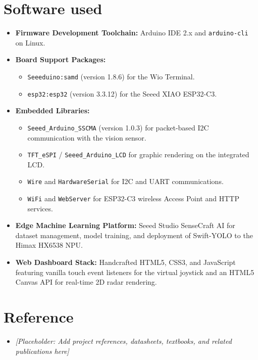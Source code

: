 \documentclass{article}
\begin{document}
\section{Software used}

\begin{itemize}
    \item \textbf{Firmware Development Toolchain:} Arduino IDE 2.x and \texttt{arduino-cli} on Linux.
    \item \textbf{Board Support Packages:}
    \begin{itemize}
        \item \texttt{Seeeduino:samd} (version 1.8.6) for the Wio Terminal.
        \item \texttt{esp32:esp32} (version 3.3.12) for the Seeed XIAO ESP32-C3.
    \end{itemize}
    \item \textbf{Embedded Libraries:}
    \begin{itemize}
        \item \texttt{Seeed\_Arduino\_SSCMA} (version 1.0.3) for packet-based I2C communication with the vision sensor.
        \item \texttt{TFT\_eSPI} / \texttt{Seeed\_Arduino\_LCD} for graphic rendering on the integrated LCD.
        \item \texttt{Wire} and \texttt{HardwareSerial} for I2C and UART communications.
        \item \texttt{WiFi} and \texttt{WebServer} for ESP32-C3 wireless Access Point and HTTP services.
    \end{itemize}
    \item \textbf{Edge Machine Learning Platform:} Seeed Studio SenseCraft AI for dataset management, model training, and deployment of Swift-YOLO to the Himax HX6538 NPU.
    \item \textbf{Web Dashboard Stack:} Handcrafted HTML5, CSS3, and JavaScript featuring vanilla touch event listeners for the virtual joystick and an HTML5 Canvas API for real-time 2D radar rendering.
\end{itemize}

\section{Reference}

\begin{itemize}
    \item \textit{[Placeholder: Add project references, datasheets, textbooks, and related publications here]}
\end{itemize}
\end{document}

